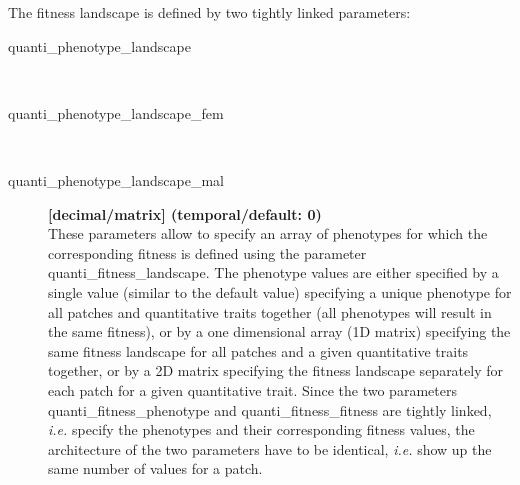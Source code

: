 \documentclass[letterpaper,12pt,oneside]{book}
\begin{document}
The fitness landscape is defined by two tightly linked parameters:

\begin{description}
\item[quanti\_phenotype\_landscape]\hspace*{\fill}\\
\vspace{-9mm}
\item[quanti\_phenotype\_landscape\_fem]\hspace*{\fill}\\
\vspace{-9mm}
\item[quanti\_phenotype\_landscape\_mal]\textbf{[decimal/matrix] (temporal/default: 0)}\\
These parameters allow to specify an array of phenotypes for which the corresponding fitness is defined using the parameter \textsf{quanti\_fitness\_landscape}.  The phenotype values are either specified by a single value (similar to the default value) specifying a unique phenotype for all patches and quantitative traits together (all phenotypes will result in the same fitness), or by a one dimensional array (1D matrix) specifying the same fitness landscape for all patches and a given quantitative traits together, or by a 2D matrix specifying the fitness landscape separately for each patch for a given quantitative trait. Since the two parameters \textsf{quanti\_fitness\_phenotype} and \textsf{quanti\_fitness\_fitness} are tightly linked, \textit{i.e.} specify the phenotypes and their corresponding fitness values, the architecture of the two parameters have to be identical, \textit{i.e.} show up the same number of values for a patch. 



\end{description}
\end{document}
